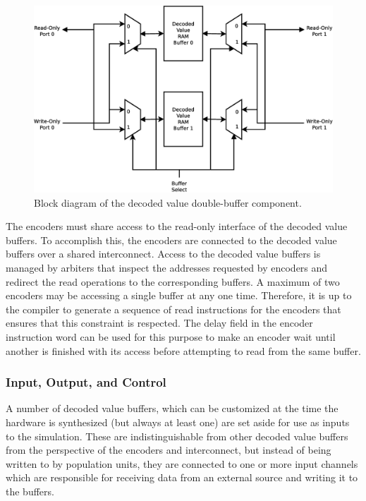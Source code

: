 \documentclass[english]{article}
\begin{document}
\begin{figure}
\centering

\includegraphics[width=6.0in]{dv-double-buffer-diagram.eps}

\caption{Block diagram of the decoded value double-buffer component.}
\label{fig:dvdoublebuffer}
\end{figure}

The encoders must share access to the read-only interface of the decoded value buffers. To accomplish this,
the encoders are connected to the decoded value buffers over a shared interconnect. Access to the decoded value buffers
is managed by arbiters that inspect the addresses requested by encoders and redirect the read operations to the
corresponding buffers. A maximum of two encoders may be accessing a single buffer at any one time.
Therefore, it is up to the compiler to generate a sequence of read instructions for the encoders that ensures that this
constraint is respected. The delay field in the encoder instruction word can be used for this purpose to make an encoder
wait until another is finished with its access before attempting to read from the same buffer.

\subsubsection{Input, Output, and Control}

A number of decoded value buffers, which can be customized at the time the hardware is synthesized
(but always at least one)
are set aside for use as inputs to the simulation. These are indistinguishable from other decoded value buffers
from the perspective of the encoders and interconnect, but instead of being written to by population units,
they are connected to one or more input channels which are responsible for receiving data from an external source
and writing it to the buffers.
\end{document}
